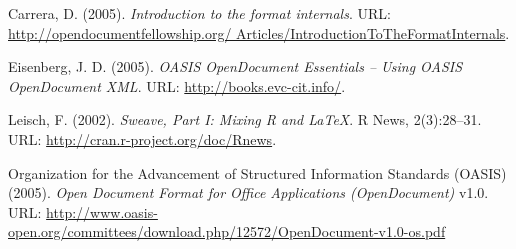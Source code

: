 \documentclass[12pt]{article}
\begin{document}
\begin{description}
\item Carrera, D. (2005). {\em Introduction to the format internals}.  URL:   \href{http://opendocumentfellowship.org/Articles/IntroductionToTheFormatInternals} {http://opendocumentfellowship.org/ Articles/IntroductionToTheFormatInternals}.

\item Eisenberg, J. D. (2005). {\em OASIS OpenDocument Essentials -- Using OASIS OpenDocument XML}. URL: \href{http://books.evc-cit.info/} {http://books.evc-cit.info/}.

\item Leisch, F. (2002). {\em Sweave, Part I: Mixing R and \LaTeX{}}. R News, 2(3):28--31. URL: \href{http://cran.r-project.org/doc/Rnews} {http://cran.r-project.org/doc/Rnews}.

\item Organization for the Advancement of Structured Information Standards (OASIS) (2005). {\em Open Document Format for Office Applications (OpenDocument)} v1.0. URL: \href{http://www.oasis-open.org/committees/download.php/12572/OpenDocument-v1.0-os.pdf} {http://www.oasis-open.org/committees/download.php/12572/OpenDocument-v1.0-os.pdf}

\end{description}
\end{document}
